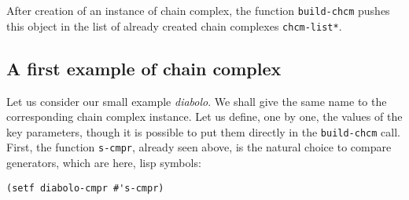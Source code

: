 After creation of an instance of chain complex, the function {\tt build-chcm} pushes this
object in the list of already created chain complexes {\tt *chcm-list*}.

\subsection* {A first example of chain complex}

Let us consider our small example {\em diabolo}. We shall give the same name to  
the corresponding chain complex  instance. 
Let us define, one by one, the values of the key parameters, 
though it is possible to put them directly in the {\tt build-chcm} call. 
First,  the function {\tt s-cmpr}, already seen above, is  the natural choice to compare
generators, which are here, lisp symbols:
{\footnotesize\begin{verbatim}
(setf diabolo-cmpr #'s-cmpr)   
\end{verbatim}}

